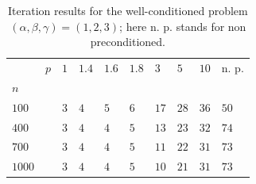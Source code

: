 \documentclass{article}
\begin{document}
\begin{table}[h]
	\caption{$ \left( \alpha, \beta, \gamma \right) = \left( 1, 2, 3 \right) $}
	\begin{tabular}{ll|llllllll}
		& $ p $ & $ 1 $ & $ 1.4 $ & $ 1.6 $ & $ 1.8 $ & $ 3 $  & $ 5 $  & $ 10 $ & n. p. \\
		$ n $    &       &       &         &         &         &        &        &        &                    \\
		$ 100 $  &       & $ 3 $ & $ 4 $   & $ 5 $   & $ 6 $   & $ 17 $ & $ 28 $ & $ 36 $ & $ 50 $             \\
		\hline
		$ 400 $  &       & $ 3 $ & $ 4 $   & $ 4 $   & $ 5 $   & $ 13 $ & $ 23 $ & $ 32 $ & $ 74 $             \\
		\hline
		$ 700 $  &       & $ 3 $ & $ 4 $   & $ 4 $   & $ 5 $   & $ 11 $ & $ 22 $ & $ 31 $ & $ 73 $             \\
		\hline
		\hline
		$ 1000 $ &       & $ 3 $ & $ 4 $   & $ 4 $   & $ 5 $   & $ 10 $ & $ 21 $ & $ 31 $ & $ 73 $
	\end{tabular}
	\caption*{Iteration results for the well-conditioned problem $ \left( \alpha, \beta, \gamma \right) = \left( 1, 2, 3 \right) $; here n. p. stands for non preconditioned.}
	\label{tab:tab_02}
\end{table}
\end{document}
